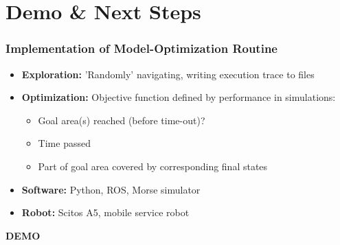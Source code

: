 \section{Demo \& Next Steps}

\begin{frame}
\frametitle{Implementation of Model-Optimization Routine}

\begin{itemize}
	\item<1-> \textbf{Exploration:} 'Randomly' navigating, writing execution trace to files
	\item<2-> \textbf{Optimization:} Objective function defined by performance in simulations:
	\begin{itemize}
		\item Goal area(s) reached (before time-out)?
		\item Time passed
		\item Part of goal area covered by corresponding final states
	\end{itemize}
	\vfill
	\item<3-> \textbf{Software:} Python, ROS, Morse simulator
	\item<3-> \textbf{Robot:} Scitos A5, mobile service robot
\end{itemize}

\end{frame}

\begin{frame}
\begin{center}

\Huge
\textbf{\textcolor{tudblue}{DEMO}}

\end{center}
\end{frame}

